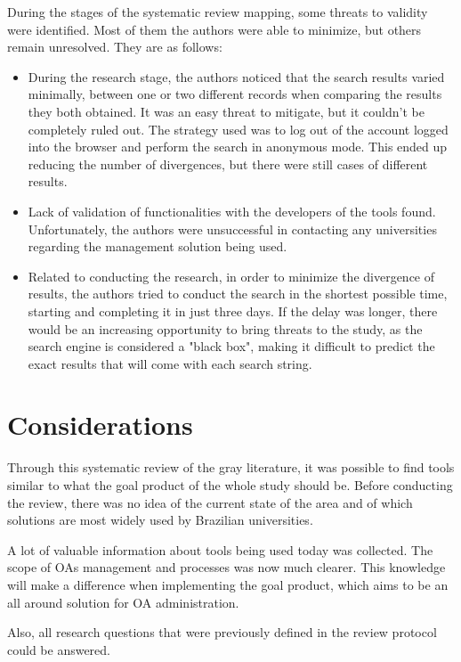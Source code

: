 During the stages of the systematic review mapping, some threats to validity were identified. Most of them the authors were able to minimize, but others remain unresolved. They are as follows:
\begin{itemize}
  \item During the research stage, the authors noticed that the search results varied minimally, between one or two different records when comparing the results they both obtained. It was an easy threat to mitigate, but it couldn't be completely ruled out. The strategy used was to log out of the account logged into the browser and perform the search in anonymous mode. This ended up reducing the number of divergences, but there were still cases of different results.
  \item Lack of validation of functionalities with the developers of the tools found. Unfortunately, the authors were unsuccessful in contacting any universities regarding the management solution being used.
  \item Related to conducting the research, in order to minimize the divergence of results, the authors tried to conduct the search in the shortest possible time, starting and completing it in just three days. If the delay was longer, there would be an increasing opportunity to bring threats to the study, as the search engine is considered a "black box", making it difficult to predict the exact results that will come with each search string.
\end{itemize}

\section{Considerations}\label{sec:gl-considerations}

Through this systematic review of the gray literature, it was possible to find tools similar to what the goal product of the whole study should be. Before conducting the review, there was no idea of the current state of the area and of which solutions are most widely used by Brazilian universities.

A lot of valuable information about tools being used today was collected. The scope of \aclp{OA} management and processes was now much clearer. This knowledge will make a difference when implementing the goal product, which aims to be an all around solution for \ac{OA} administration.

Also, all research questions that were previously defined in the review protocol could be answered.